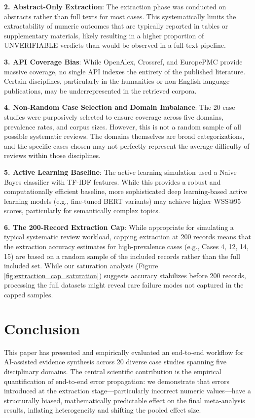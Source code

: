 \documentclass[12pt]{article}
\begin{document}
\textbf{2. Abstract-Only Extraction}: The extraction phase was conducted on abstracts rather than full texts for most cases. This systematically limits the extractability of numeric outcomes that are typically reported in tables or supplementary materials, likely resulting in a higher proportion of UNVERIFIABLE verdicts than would be observed in a full-text pipeline.

\textbf{3. API Coverage Bias}: While OpenAlex, Crossref, and EuropePMC provide massive coverage, no single API indexes the entirety of the published literature. Certain disciplines, particularly in the humanities or non-English language publications, may be underrepresented in the retrieved corpora.

\textbf{4. Non-Random Case Selection and Domain Imbalance}: The 20 case studies were purposively selected to ensure coverage across five domains, prevalence rates, and corpus sizes. However, this is not a random sample of all possible systematic reviews. The domains themselves are broad categorizations, and the specific cases chosen may not perfectly represent the average difficulty of reviews within those disciplines.

\textbf{5. Active Learning Baseline}: The active learning simulation used a Naive Bayes classifier with TF-IDF features. While this provides a robust and computationally efficient baseline, more sophisticated deep learning-based active learning models (e.g., fine-tuned BERT variants) may achieve higher WSS@95 scores, particularly for semantically complex topics.

\textbf{6. The 200-Record Extraction Cap}: While appropriate for simulating a typical systematic review workload, capping extraction at 200 records means that the extraction accuracy estimates for high-prevalence cases (e.g., Cases 4, 12, 14, 15) are based on a random sample of the included records rather than the full included set. While our saturation analysis (Figure \ref{fig:extraction_cap_saturation}) suggests accuracy stabilizes before 200 records, processing the full datasets might reveal rare failure modes not captured in the capped samples.

\section{Conclusion}

This paper has presented and empirically evaluated an end-to-end workflow for AI-assisted evidence synthesis across 20 diverse case studies spanning five disciplinary domains. The central scientific contribution is the empirical quantification of end-to-end error propagation: we demonstrate that errors introduced at the extraction stage---particularly incorrect numeric values---have a structurally biased, mathematically predictable effect on the final meta-analysis results, inflating heterogeneity and shifting the pooled effect size.
\end{document}
